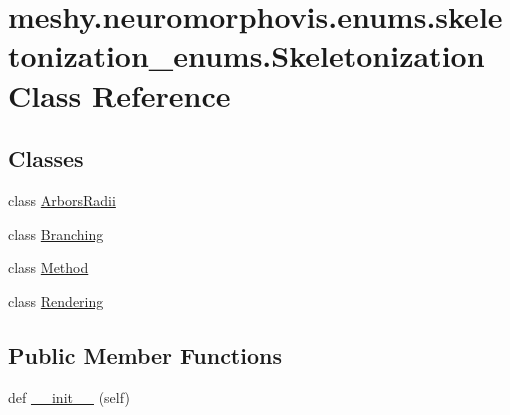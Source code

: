 \hypertarget{classmeshy_1_1neuromorphovis_1_1enums_1_1skeletonization__enums_1_1Skeletonization}{}\section{meshy.\+neuromorphovis.\+enums.\+skeletonization\+\_\+enums.\+Skeletonization Class Reference}
\label{classmeshy_1_1neuromorphovis_1_1enums_1_1skeletonization__enums_1_1Skeletonization}


 


\subsection*{Classes}
\begin{DoxyCompactItemize}
\item 
class \hyperlink{classmeshy_1_1neuromorphovis_1_1enums_1_1skeletonization__enums_1_1Skeletonization_1_1ArborsRadii}{Arbors\+Radii}
\item 
class \hyperlink{classmeshy_1_1neuromorphovis_1_1enums_1_1skeletonization__enums_1_1Skeletonization_1_1Branching}{Branching}
\item 
class \hyperlink{classmeshy_1_1neuromorphovis_1_1enums_1_1skeletonization__enums_1_1Skeletonization_1_1Method}{Method}
\item 
class \hyperlink{classmeshy_1_1neuromorphovis_1_1enums_1_1skeletonization__enums_1_1Skeletonization_1_1Rendering}{Rendering}
\end{DoxyCompactItemize}
\subsection*{Public Member Functions}
\begin{DoxyCompactItemize}
\item 
def \hyperlink{classmeshy_1_1neuromorphovis_1_1enums_1_1skeletonization__enums_1_1Skeletonization_ad81be91ca19e7fc190ddeb3969481bf2}{\+\_\+\+\_\+init\+\_\+\+\_\+} (self)\hypertarget{classmeshy_1_1neuromorphovis_1_1enums_1_1skeletonization__enums_1_1Skeletonization_ad81be91ca19e7fc190ddeb3969481bf2}{}\label{classmeshy_1_1neuromorphovis_1_1enums_1_1skeletonization__enums_1_1Skeletonization_ad81be91ca19e7fc190ddeb3969481bf2}

\end{DoxyCompactItemize}


